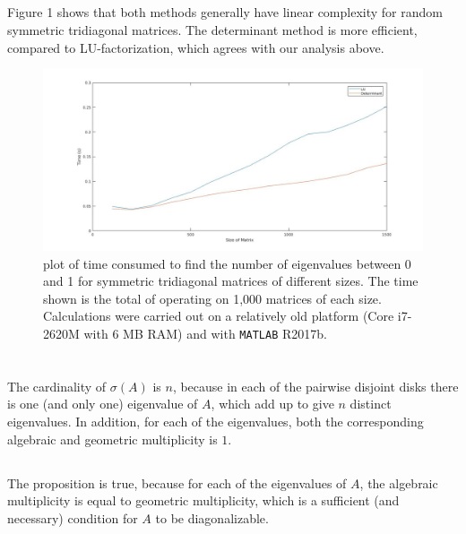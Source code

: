 \documentclass[11pt]{article}
\begin{document}
\subsection{}
Figure 1 shows that both methods generally have linear complexity for random symmetric tridiagonal matrices. The determinant method is more efficient, compared to LU-factorization, which agrees with our analysis above.
\begin{figure}[t]
\centering
{
\includegraphics[width=14cm]{matlab/prob1.jpg}
\caption{plot of time consumed to find the number of eigenvalues between 0 and 1 for symmetric tridiagonal matrices of different sizes. The time shown is the total of operating on 1,000 matrices of each size. Calculations were carried out on a relatively old platform (Core i7-2620M with 6 MB RAM) and with \texttt{MATLAB} R2017b.}
}
\end{figure}
\pagebreak
\section{}
\subsection{}
The cardinality of $\sigma(A)$ is $n$, because in each of the pairwise disjoint disks there is one (and only one) eigenvalue of $A$, which add up to give $n$ distinct eigenvalues. In addition, for each of the eigenvalues, both the corresponding algebraic and geometric multiplicity is $1$.

\subsection{}
The proposition is true, because for each of the eigenvalues of $A$, the algebraic multiplicity is equal to geometric multiplicity, which is a sufficient (and necessary) condition for $A$ to be diagonalizable.
\end{document}
